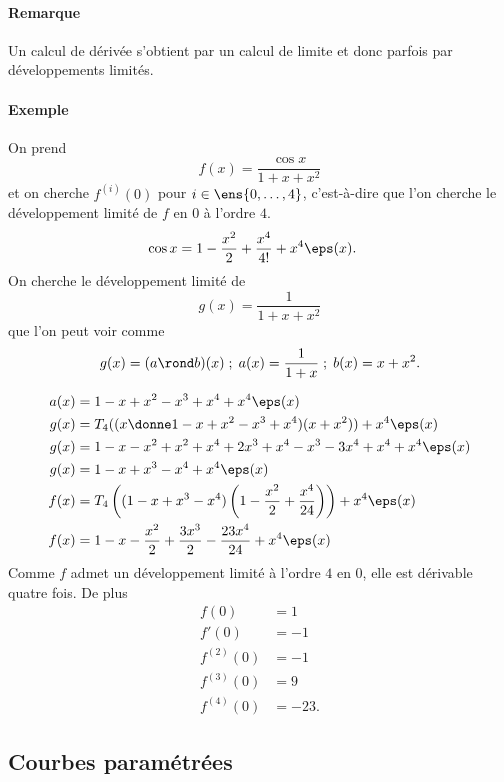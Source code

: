 \paragraph{Remarque}Un calcul de dérivée s'obtient par un calcul de limite et donc parfois par développements limités.
\paragraph{Exemple}On prend \[ f(x) = \frac{\cos x}{1+x+x^{2}}\]et on cherche $f^{(i)}(0)$ pour $i \in \ens{0,\ldots,4}$, c'est-à-dire que l'on cherche le développement limité de $f$ en $0$ à l'ordre $4$.
\begin{align*}
\cos x &= 1 - \frac{x^{2}}{2} + \frac{x^{4}}{4!} + x^{4}\eps(x).
\end{align*}
On cherche le développement limité de \[ g(x) = \frac{1}{1+x+x^{2}}\]que l'on peut voir comme \[ g(x) = (a\rond b)(x)\; ; \; a(x) = \frac{1}{1+x} \; ; \; b(x) = x+x^{2}.\]

\begin{align*}
a(x) &= 1 - x + x^{2} - x^{3} + x^{4} + x^{4}\eps(x) \\
g(x) &= T_4((x\donne  1 - x + x^{2} - x^{3} + x^{4} )(x+x^{2})) + x^{4}\eps(x) \\
g(x) &= 1 - x - x^{2} + x^{2} + x^{4} + 2x^{3} +x^{4} - x^{3} - 3x^{4} + x^{4 }+ x^{4}\eps(x)\\
g(x) &= 1 - x + x^{3} - x^{4} + x^{4}\eps(x) \\
f(x) &= T_4\left( (1-x+x^{3}-x^{4})\left(1 - \frac{x^{2}}{2} + \frac{x^{4}}{24}\right)\right) + x^{4}\eps(x) \\
f(x) &= 1 - x -\frac{x^{2}}{2} + \frac{3x^{3}}{2} - \frac{23x^{4}}{24} + x^{4}\eps(x)
\end{align*}
Comme $f$ admet un développement limité à l'ordre $4$ en $0$, elle est dérivable quatre fois. De plus 
\begin{align*}
f(0) &= 1 \\
f'(0) &= -1 \\
f^{(2)}(0) &= -1 \\
f^{(3)}(0) &= 9 \\
f^{(4)}(0) &= -23.
\end{align*}

\subsection{Courbes paramétrées}

